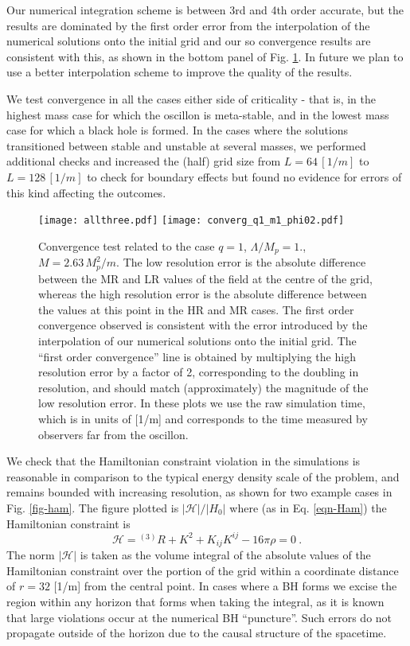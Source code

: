 \documentclass[11pt,a4paper]{article}
\begin{document}
Our numerical integration scheme is between 3rd and 4th order accurate, but the results are dominated by the first order error from the interpolation of the numerical solutions onto the initial grid and our so convergence results are consistent with this, as shown in the bottom panel of Fig. \ref{fig-converge}. In future we plan to use a better interpolation scheme to improve the quality of the results.

We test convergence in all the cases either side of criticality - that is, in the highest mass case for which the oscillon is meta-stable, and in the lowest mass case for which a black hole is formed. In the cases where the solutions transitioned between stable and unstable at several masses, we performed additional checks and increased the (half) grid size from $L=64\, [1/m]$ to $L=128 \,[1/m]$ to check for boundary effects but found no evidence for errors of this kind affecting the outcomes. 

\begin{figure}[]\centering
\texttt{[image: allthree.pdf]}
\texttt{[image: converg\_q1\_m1\_phi02.pdf]}

\caption{Convergence test related to the case $q=1$, $\Lambda/M_p=1.$, $M = 2.63 \, M_p^2/m$.  The low resolution error is the absolute difference between the MR and LR values of the field at the centre of the grid, whereas the high resolution error is the absolute difference between the values at this point in the HR and MR cases. The first order convergence observed is consistent with the error introduced by the interpolation of our numerical solutions onto the initial grid. The ``first order convergence'' line is obtained by multiplying the high resolution error by a factor of 2, corresponding to the doubling in resolution, and should match (approximately) the magnitude of the low resolution error. In these plots we use the raw simulation time, which is in units of [1/m] and corresponds to the time measured by observers far from the oscillon.}
\label{fig-converge}
\end{figure}

We check that the Hamiltonian constraint violation in the simulations is reasonable in comparison to the typical energy density scale of the problem, and remains bounded with increasing resolution, as shown for two example cases in Fig. \ref{fig-ham}. The figure plotted is $|\mathcal{H}|/ |H_0|$ where (as in Eq. \eqref{eqn-Ham}) the Hamiltonian constraint is
\begin{equation}
	\mathcal{H} = {}^{(3)} R + K^2 + K_{ij} K^{ij} - 16 \pi \rho = 0 ~ .
\end{equation}
The norm $|\mathcal{H}|$ is taken as the volume integral of the absolute values of the Hamiltonian constraint over the portion of the grid within a coordinate distance of $r = 32$ [1/m] from the central point. In cases where a BH forms we excise the region within any horizon that forms when taking the integral, as it is known that large violations occur at the numerical BH ``puncture''. Such errors do not propagate outside of the horizon due to the causal structure of the spacetime. 
\end{document}
